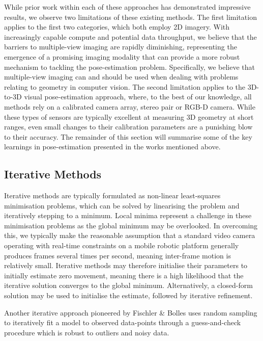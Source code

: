 While prior work within each of these approaches has demonstrated impressive results, we observe two limitations of these existing methods. The first limitation applies to the first two categories, which both employ 2D imagery. With increasingly capable compute and potential data throughput, we believe that the barriers to multiple-view imaging are rapidly diminishing, representing the emergence of a promising imaging modality that can provide a more robust mechanism to tackling the pose-estimation problem. Specifically, we believe that multiple-view imaging can and should be used when dealing with problems relating to geometry in computer vision. The second limitation applies to the 3D-to-3D visual pose-estimation approach, where, to the best of our knowledge, all methods rely on a calibrated camera array, stereo pair or RGB-D camera. While these types of sensors are typically excellent at measuring 3D geometry at short ranges, even small changes to their calibration parameters are a punishing blow to their accuracy. The remainder of this section will summarise some of the key learnings in pose-estimation presented in the works mentioned above.

\subsection{Iterative Methods}
Iterative methods are typically formulated as non-linear least-squares minimisation problems, which can be solved by linearising the problem and iteratively stepping to a minimum. Local minima represent a challenge in these minimisation problems as the global minimum may be overlooked. In overcoming this, we typically make the reasonable assumption that a standard video camera operating with real-time constraints on a mobile robotic platform generally produces frames several times per second, meaning inter-frame motion is relatively small. Iterative methods may therefore initialise their parameters to initially estimate zero movement, meaning there is a high likelihood that the iterative solution converges to the global minimum. Alternatively, a closed-form solution may be used to initialise the estimate, followed by iterative refinement.

Another iterative approach pioneered by Fischler \& Bolles \cite{bolles1981ransac} uses random sampling to iteratively fit a model to observed data-points through a guess-and-check procedure which is robust to outliers and noisy data.

